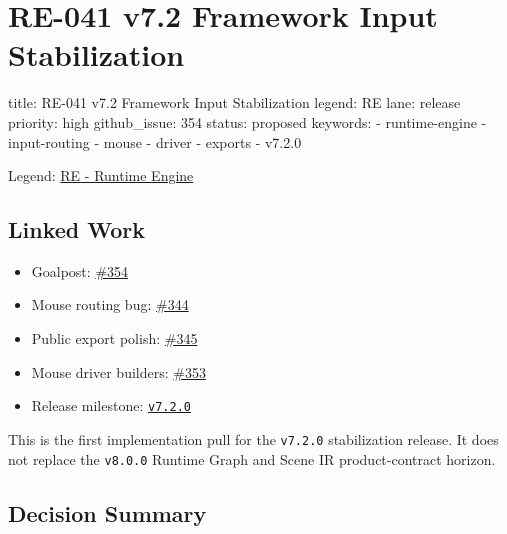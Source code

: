 \chapter{RE-041 v7.2 Framework Input Stabilization}\label{record-165}

\smallskip

\begin{RecordMeta}
title: RE-041 v7.2 Framework Input Stabilization
legend: RE
lane: release
priority: high
github_issue: 354
status: proposed
keywords:
  - runtime-engine
  - input-routing
  - mouse
  - driver
  - exports
  - v7.2.0

\end{RecordMeta}

Legend: \href{https://github.com/flyingrobots/bijou/blob/1853ad902f6bf219326409e7f743a5a1d6517dbc/docs/legends/RE-runtime-engine.md}{RE - Runtime Engine}

\section{Linked Work}\label{record-165-linked-work}

\begin{itemize}
\tightlist
\item
  Goalpost: \href{https://github.com/flyingrobots/bijou/issues/354}{\#354}
\item
  Mouse routing bug: \href{https://github.com/flyingrobots/bijou/issues/344}{\#344}
\item
  Public export polish: \href{https://github.com/flyingrobots/bijou/issues/345}{\#345}
\item
  Mouse driver builders: \href{https://github.com/flyingrobots/bijou/issues/353}{\#353}
\item
  Release milestone: \href{https://github.com/flyingrobots/bijou/milestone/5}{\texttt{v\allowbreak{}7\allowbreak{}.\allowbreak{}2\allowbreak{}.\allowbreak{}0}}
\end{itemize}

This is the first implementation pull for the \texttt{v\allowbreak{}7\allowbreak{}.\allowbreak{}2\allowbreak{}.\allowbreak{}0} stabilization release. It does not replace the \texttt{v\allowbreak{}8\allowbreak{}.\allowbreak{}0\allowbreak{}.\allowbreak{}0} Runtime Graph and Scene IR product-contract horizon.

\section{Decision Summary}\label{record-165-decision-summary}

